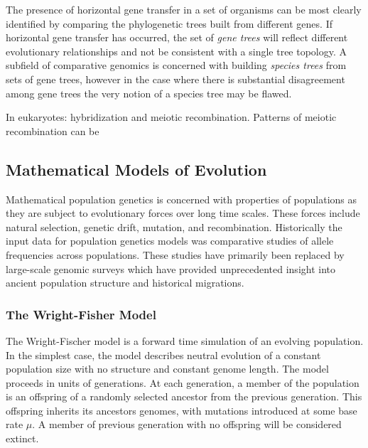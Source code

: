 The presence of horizontal gene transfer in a set of organisms can be most clearly identified by comparing the phylogenetic trees built from different genes.
If horizontal gene transfer has occurred, the set of \emph{gene trees} will reflect different evolutionary relationships and not be consistent with a single tree topology.
A subfield of comparative genomics is concerned with building \emph{species trees} from sets of gene trees, however in the case where there is substantial disagreement among gene trees the very notion of a species tree may be flawed.

In eukaryotes: hybridization and meiotic recombination.
Patterns of meiotic recombination can be 

\subsection{Mathematical Models of Evolution}

Mathematical population genetics is concerned with properties of populations as they are subject to evolutionary forces over long time scales.
These forces include natural selection, genetic drift, mutation, and recombination.
Historically the input data for population genetics models was comparative studies of allele frequencies across populations.
These studies have primarily been replaced by large-scale genomic surveys which have provided unprecedented insight into ancient population structure and historical migrations.

\subsubsection{The Wright-Fisher Model}

The Wright-Fischer model is a forward time simulation of an evolving population.
In the simplest case, the model describes neutral evolution of a constant population size with no structure and constant genome length.
The model proceeds in units of generations.
At each generation, a member of the population is an offspring of a randomly selected ancestor from the previous generation.
This offspring inherits its ancestors genomes, with mutations introduced at some base rate $\mu$.
A member of previous generation with no offspring will be considered extinct.


